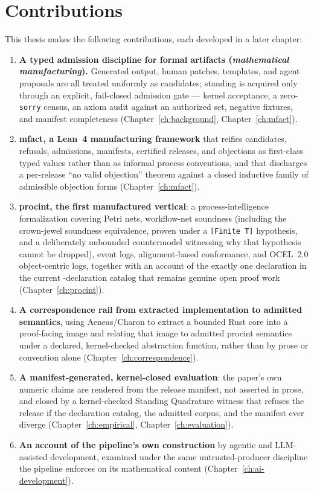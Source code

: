 \section{Contributions}

This thesis makes the following contributions, each developed in a later
chapter:

\begin{enumerate}
\item \textbf{A typed admission discipline for formal artifacts
  (\emph{mathematical manufacturing}).} Generated output, human patches,
  templates, and agent proposals are all treated uniformly as
  candidates; standing is acquired only through an explicit, fail-closed
  admission gate --- kernel acceptance, a zero-\texttt{sorry} census, an
  axiom audit against an authorized set, negative fixtures, and manifest
  completeness (Chapter~\ref{ch:background}, Chapter~\ref{ch:mfact}).
\item \textbf{\textsf{mfact}, a Lean~4 manufacturing framework} that
  reifies candidates, refusals, admissions, manifests, certified
  releases, and objections as first-class typed values rather than as
  informal process conventions, and that discharges a per-release
  ``no valid objection'' theorem against a closed inductive family of
  admissible objection forms (Chapter~\ref{ch:mfact}).
\item \textbf{\textsf{procint}, the first manufactured vertical}: a
  process-intelligence formalization covering Petri nets, workflow-net
  soundness (including the crown-jewel soundness equivalence, proven
  under a \texttt{[Finite T]} hypothesis, and a deliberately unbounded
  countermodel witnessing why that hypothesis cannot be dropped), event
  logs, alignment-based conformance, and OCEL~2.0 object-centric logs,
  together with an account of the exactly one declaration in the current
  \TotalDecls-declaration catalog that remains genuine open proof work
  (Chapter~\ref{ch:procint}).
\item \textbf{A correspondence rail from extracted implementation to
  admitted semantics}, using Aeneas/Charon to extract a bounded Rust core
  into a proof-facing image and relating that image to admitted
  \textsf{procint} semantics under a declared, kernel-checked abstraction
  function, rather than by prose or convention alone
  (Chapter~\ref{ch:correspondence}).
\item \textbf{A manifest-generated, kernel-closed evaluation}: the
  paper's own numeric claims are rendered from the release manifest, not
  asserted in prose, and closed by a kernel-checked Standing Quadrature
  witness that refuses the release if the declaration catalog, the
  admitted corpus, and the manifest ever diverge (Chapter~\ref{ch:empirical},
  Chapter~\ref{ch:evaluation}).
\item \textbf{An account of the pipeline's own construction} by agentic
  and LLM-assisted development, examined under the same untrusted-producer
  discipline the pipeline enforces on its mathematical content
  (Chapter~\ref{ch:ai-development}).
\end{enumerate}

